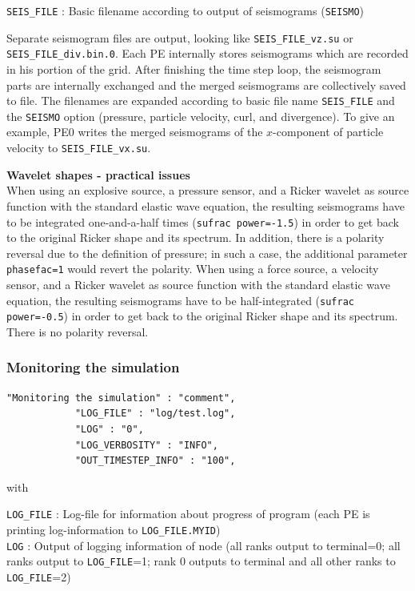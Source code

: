 \texttt{SEIS\_FILE} : Basic filename according to output of seismograms (\texttt{SEISMO})

Separate seismogram files are output, looking like \texttt{SEIS\_FILE\_vz.su} or \texttt{SEIS\_FILE\_div.bin.0}. Each PE internally stores seismograms which are recorded in his portion of the grid. After finishing the time step loop, the seismogram parts are internally exchanged and the merged seismograms are collectively saved to file. The filenames are expanded according to basic file name \texttt{SEIS\_FILE} and the \texttt{SEISMO} option (pressure, particle velocity, curl, and divergence). To give an example, PE0 writes the merged seismograms of the $x$-component of particle velocity to \texttt{SEIS\_FILE\_vx.su}.

\textbf{Wavelet shapes - practical issues}\\
When using an explosive source, a pressure sensor, and a Ricker wavelet as
source function with the standard elastic wave equation, the
resulting seismograms have to be integrated one-and-a-half times (\texttt{sufrac power=-1.5}) in order to get back to the original Ricker shape and its spectrum. In addition, there is a polarity reversal due to the definition of pressure; in such a case, the additional parameter \texttt{phasefac=1} would revert the polarity. When using a force source, a velocity sensor, and a Ricker wavelet as source function with the standard elastic wave equation, the resulting seismograms have to be half-integrated (\texttt{sufrac power=-0.5}) in order to get back to the original Ricker shape and its spectrum. There is no polarity reversal.

\subsubsection{Monitoring the simulation}
\begin{verbatim}
"Monitoring the simulation" : "comment",
            "LOG_FILE" : "log/test.log",
            "LOG" : "0",
            "LOG_VERBOSITY" : "INFO",
            "OUT_TIMESTEP_INFO" : "100",
\end{verbatim}

with

\texttt{LOG\_FILE} : Log-file for information about progress of program (each PE is printing log-information to \texttt{LOG\_FILE.MYID})\\
\texttt{LOG} : Output of logging information of node (all ranks output to terminal=0; all ranks output to \texttt{LOG\_FILE}=1; rank 0 outputs to terminal and all other ranks to \texttt{LOG\_FILE}=2)

